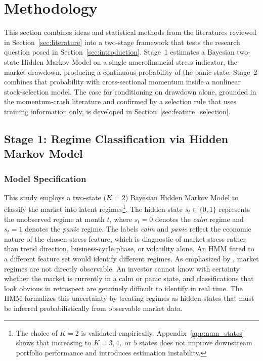 \newpage
\section{Methodology}\label{sec:methodology}


This section combines ideas and statistical methods from the literatures reviewed in Section~\ref{sec:literature} into a two-stage framework that tests the research question posed in Section~\ref{sec:introduction}. Stage~1 estimates a Bayesian two-state Hidden Markov Model on a single macrofinancial stress indicator, the market drawdown, producing a continuous probability of the panic state. Stage~2 combines that probability with cross-sectional momentum inside a nonlinear stock-selection model. The case for conditioning on drawdown alone, grounded in the momentum-crash literature and confirmed by a selection rule that uses training information only, is developed in Section~\ref{sec:feature_selection}.

\subsection{Stage 1: Regime Classification via Hidden Markov Model}\label{sec:stage1}

\subsubsection{Model Specification}\label{sec:hmm_spec}

This study employs a two-state ($K = 2$) Bayesian Hidden Markov Model to classify the market into latent regimes\footnote{The choice of $K = 2$ is validated empirically. Appendix~\ref{app:num_states} shows that increasing to $K = 3, 4,$ or $5$ states does not improve downstream portfolio performance and introduces estimation instability.}. The hidden state $s_t \in \{0, 1\}$ represents the unobserved regime at month $t$, where $s_t = 0$ denotes the \emph{calm} regime and $s_t = 1$ denotes the \emph{panic} regime. The labels \emph{calm} and \emph{panic} reflect the economic nature of the chosen stress feature, which is diagnostic of market stress rather than trend direction, business-cycle phase, or volatility alone. An HMM fitted to a different feature set would identify different regimes. As emphasized by \citet{Hamilton1989}, market regimes are not directly observable. An investor cannot know with certainty whether the market is currently in a calm or panic state, and classifications that look obvious in retrospect are genuinely difficult to identify in real time. The HMM formalizes this uncertainty by treating regimes as hidden states that must be inferred probabilistically from observable market data.

